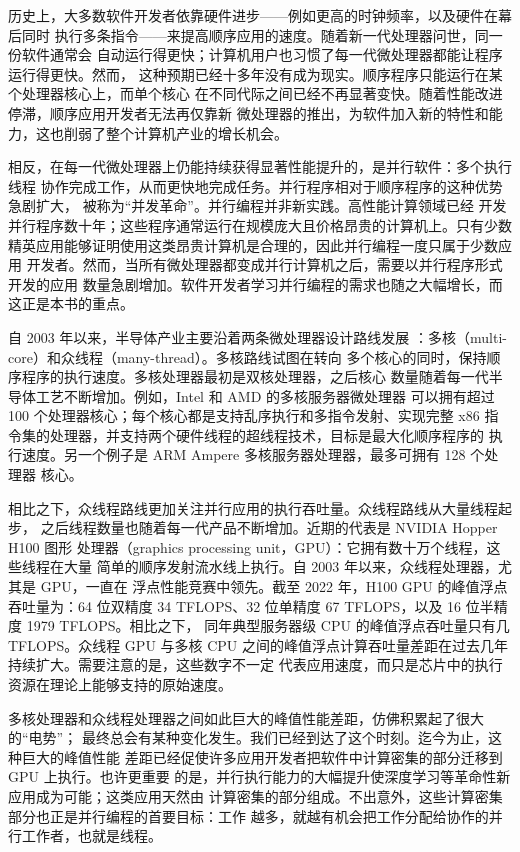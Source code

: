 历史上，大多数软件开发者依靠硬件进步——例如更高的时钟频率，以及硬件在幕后同时
执行多条指令——来提高顺序应用的速度。随着新一代处理器问世，同一份软件通常会
自动运行得更快；计算机用户也习惯了每一代微处理器都能让程序运行得更快。然而，
这种预期已经十多年没有成为现实。顺序程序只能运行在某个处理器核心上，而单个核心
在不同代际之间已经不再显著变快。随着性能改进停滞，顺序应用开发者无法再仅靠新
微处理器的推出，为软件加入新的特性和能力，这也削弱了整个计算机产业的增长机会。

相反，在每一代微处理器上仍能持续获得显著性能提升的，是并行软件：多个执行线程
协作完成工作，从而更快地完成任务。并行程序相对于顺序程序的这种优势急剧扩大，
被称为“并发革命”\cite{sutter2005}。并行编程并非新实践。高性能计算领域已经
开发并行程序数十年；这些程序通常运行在规模庞大且价格昂贵的计算机上。只有少数
精英应用能够证明使用这类昂贵计算机是合理的，因此并行编程一度只属于少数应用
开发者。然而，当所有微处理器都变成并行计算机之后，需要以并行程序形式开发的应用
数量急剧增加。软件开发者学习并行编程的需求也随之大幅增长，而这正是本书的重点。

自 2003 年以来，半导体产业主要沿着两条微处理器设计路线发展
\cite{hwu2008}：多核（multi-core）和众线程（many-thread）。多核路线试图在转向
多个核心的同时，保持顺序程序的执行速度。多核处理器最初是双核处理器，之后核心
数量随着每一代半导体工艺不断增加。例如，Intel 和 AMD 的多核服务器微处理器
可以拥有超过 100 个处理器核心；每个核心都是支持乱序执行和多指令发射、实现完整
x86 指令集的处理器，并支持两个硬件线程的超线程技术，目标是最大化顺序程序的
执行速度。另一个例子是 ARM Ampere 多核服务器处理器，最多可拥有 128 个处理器
核心。

相比之下，众线程路线更加关注并行应用的执行吞吐量。众线程路线从大量线程起步，
之后线程数量也随着每一代产品不断增加。近期的代表是 NVIDIA Hopper H100 图形
处理器（graphics processing unit，GPU）：它拥有数十万个线程，这些线程在大量
简单的顺序发射流水线上执行。自 2003 年以来，众线程处理器，尤其是 GPU，一直在
浮点性能竞赛中领先。截至 2022 年，H100 GPU 的峰值浮点吞吐量为：64 位双精度
34 TFLOPS、32 位单精度 67 TFLOPS，以及 16 位半精度 1979 TFLOPS。相比之下，
同年典型服务器级 CPU 的峰值浮点吞吐量只有几 TFLOPS。众线程 GPU 与多核 CPU
之间的峰值浮点计算吞吐量差距在过去几年持续扩大。需要注意的是，这些数字不一定
代表应用速度，而只是芯片中的执行资源在理论上能够支持的原始速度。

多核处理器和众线程处理器之间如此巨大的峰值性能差距，仿佛积累起了很大的“电势”；
最终总会有某种变化发生。我们已经到达了这个时刻。迄今为止，这种巨大的峰值性能
差距已经促使许多应用开发者把软件中计算密集的部分迁移到 GPU 上执行。也许更重要
的是，并行执行能力的大幅提升使深度学习等革命性新应用成为可能；这类应用天然由
计算密集的部分组成。不出意外，这些计算密集部分也正是并行编程的首要目标：工作
越多，就越有机会把工作分配给协作的并行工作者，也就是线程。

